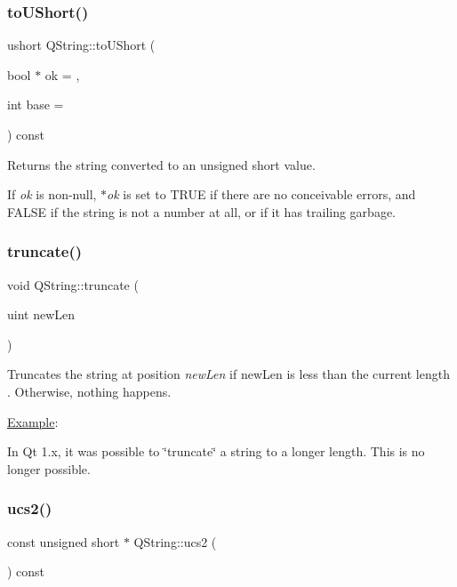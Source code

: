 \subsubsection{\texorpdfstring{toUShort()}{toUShort()}}
{\footnotesize\ttfamily ushort Q\+String\+::to\+U\+Short (\begin{DoxyParamCaption}\item[{bool $\ast$}]{ok = {},  }\item[{int}]{base = {} }\end{DoxyParamCaption}) const}

Returns the string converted to an {\ttfamily unsigned short} value.

If {\itshape ok} is non-\/null, {\itshape $\ast$ok} is set to T\+R\+UE if there are no conceivable errors, and F\+A\+L\+SE if the string is not a number at all, or if it has trailing garbage. \mbox{\label{class_q_string_a6a7546dfb7ad7b0e5d982078c03595db}} 
\subsubsection{\texorpdfstring{truncate()}{truncate()}}
{\footnotesize\ttfamily void Q\+String\+::truncate (\begin{DoxyParamCaption}\item[{uint}]{new\+Len }\end{DoxyParamCaption})}

Truncates the string at position {\itshape new\+Len} if new\+Len is less than the current length . Otherwise, nothing happens.

\mbox{\hyperlink{struct_example}{Example}}\+: 
\begin{DoxyCode}{0}
\end{DoxyCode}


In Qt 1.\+x, it was possible to \char`\"{}truncate\char`\"{} a string to a longer length. This is no longer possible. \mbox{\label{class_q_string_a25bed3caa16f09a748d9da0fdf4cea4a}} 
\subsubsection{\texorpdfstring{ucs2()}{ucs2()}}
{\footnotesize\ttfamily const unsigned short $\ast$ Q\+String\+::ucs2 (\begin{DoxyParamCaption}{ }\end{DoxyParamCaption}) const}

